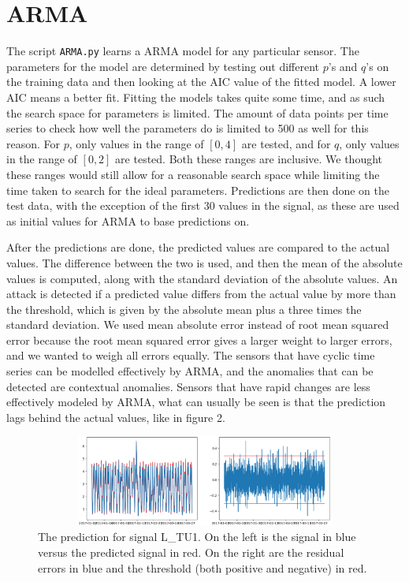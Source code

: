 \documentclass[]{article}
\begin{document}
\clearpage
\section{ARMA}
The script \texttt{ARMA.py} learns a ARMA model for any particular sensor. The parameters for the model are determined by testing out different $p$'s and $q$'s on the training data and then looking at the AIC value of the fitted model. A lower AIC means a better fit. Fitting the models takes quite some time, and as such the search space for parameters is limited. The amount of data points per time series to check how well the parameters do is limited to 500 as well for this reason. For $p$, only values in the range of $[0, 4]$ are tested, and for $q$, only values in the range of $[0, 2]$ are tested. Both these ranges are inclusive. We thought these ranges would still allow for a reasonable search space while limiting the time taken to search for the ideal parameters. Predictions are then done on the test data, with the exception of the first 30 values in the signal, as these are used as initial values for ARMA to base predictions on.

After the predictions are done, the predicted values are compared to the actual values. The difference between the two is used, and then the mean of the absolute values is computed, along with the standard deviation of the absolute values. An attack is detected if a predicted value differs from the actual value by more than the threshold, which is given by the absolute mean plus a three times the standard deviation. We used mean absolute error instead of root mean squared error because the root mean squared error gives a larger weight to larger errors, and we wanted to weigh all errors equally. The sensors that have cyclic time series can be modelled effectively by ARMA, and the anomalies that can be detected are contextual anomalies. Sensors that have rapid changes are less effectively modeled by ARMA, what can usually be seen is that the prediction lags behind the actual values, like in figure 2. 
\begin{center}
\begin{figure}[H]
  \includegraphics[width=16cm, height=3cm]{./visuallizations/arma_3stddev_LTU1.png}
  \caption{The prediction for signal L\_TU1. On the left is the signal in blue versus the predicted signal in red. On the right are the residual errors in blue and the threshold (both positive and negative) in red.}
  \label{signals}
\end{figure}
\end{center}
\end{document}
